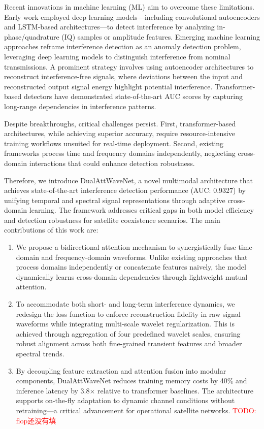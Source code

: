 \documentclass[12pt]{article}
\newcommand{\todo}[1]{\textcolor{red}{TODO: #1}}
\begin{document}
Recent innovations in machine learning (ML) aim to overcome these limitations. Early work employed deep learning models—including convolutional autoencoders\cite{saifaldawlaConvolutionalAutoencodersNonGeostationary2024} and LSTM-based architectures\cite{9384473}—to detect interference by analyzing in-phase/quadrature (IQ) samples or amplitude features. Emerging machine learning approaches reframe interference detection as an anomaly detection problem, leveraging deep learning models to distinguish interference from nominal transmissions.  A prominent strategy involves using autoencoder architectures to reconstruct interference-free signals, where deviations between the input and reconstructed output signal energy highlight potential interference.  Transformer-based detectors have demonstrated state-of-the-art AUC scores by capturing long-range dependencies in interference patterns\cite{saifaldawlaGenAIBasedModelsNGSO2024}.

Despite breakthroughs, critical challenges persist. First, transformer-based architectures, while achieving superior accuracy, require resource-intensive training workflows unsuited for real-time deployment. Second, existing frameworks process time and frequency domains independently, neglecting cross-domain interactions that could enhance detection robustness.

Therefore, we introduce DualAttWaveNet, a novel multimodal architecture that achieves state-of-the-art interference detection performance (AUC: 0.9327) by unifying temporal and spectral signal representations through adaptive cross-domain learning. The framework addresses critical gaps in both model efficiency and detection robustness for satellite coexistence scenarios. The main contributions of this work are:

\begin{enumerate}
    \item We propose a bidirectional attention mechanism to synergistically fuse time-domain and frequency-domain waveforms. Unlike existing approaches that process domains independently or concatenate features naively, the model dynamically learns cross-domain dependencies through lightweight mutual attention.
    \item To accommodate both short- and long-term interference dynamics, we redesign the loss function to enforce reconstruction fidelity in raw signal waveforms while integrating multi-scale wavelet regularization. This is achieved through aggregation of four predefined wavelet scales, ensuring robust alignment across both fine-grained transient features and broader spectral trends.
    \item By decoupling feature extraction and attention fusion into modular components, DualAttWaveNet reduces training memory costs by 40\% and inference latency by 3.8× relative to transformer baselines. The architecture supports on-the-fly adaptation to dynamic channel conditions without retraining—a critical advancement for operational satellite networks. \todo{flop还没有填}
\end{enumerate}
\end{document}
